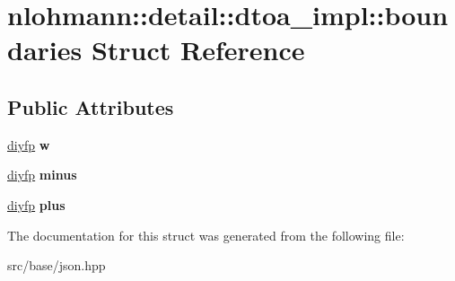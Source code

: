 \hypertarget{structnlohmann_1_1detail_1_1dtoa__impl_1_1boundaries}{}\section{nlohmann\+:\+:detail\+:\+:dtoa\+\_\+impl\+:\+:boundaries Struct Reference}
\label{structnlohmann_1_1detail_1_1dtoa__impl_1_1boundaries}
\subsection*{Public Attributes}
\begin{DoxyCompactItemize}
\item 
\mbox{\label{structnlohmann_1_1detail_1_1dtoa__impl_1_1boundaries_ad1668c60aeade5f2557fafed8b8aee1a}} 
\mbox{\hyperlink{structnlohmann_1_1detail_1_1dtoa__impl_1_1diyfp}{diyfp}} {\bfseries w}
\item 
\mbox{\label{structnlohmann_1_1detail_1_1dtoa__impl_1_1boundaries_aec4e5028333c01f3229062f31ce16763}} 
\mbox{\hyperlink{structnlohmann_1_1detail_1_1dtoa__impl_1_1diyfp}{diyfp}} {\bfseries minus}
\item 
\mbox{\label{structnlohmann_1_1detail_1_1dtoa__impl_1_1boundaries_a3321ae2816a6ec5250a0d8e29f798232}} 
\mbox{\hyperlink{structnlohmann_1_1detail_1_1dtoa__impl_1_1diyfp}{diyfp}} {\bfseries plus}
\end{DoxyCompactItemize}


The documentation for this struct was generated from the following file\+:\begin{DoxyCompactItemize}
\item 
src/base/json.\+hpp\end{DoxyCompactItemize}

